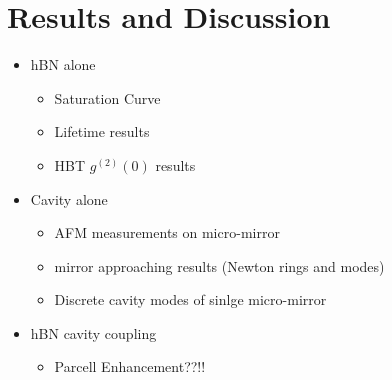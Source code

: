 \section{Results and Discussion}

\begin{itemize}
    \item hBN alone
    \begin{itemize}
        \item Saturation Curve
        \item Lifetime results
        \item HBT $g^{(2)}(0)$ results
    \end{itemize}
    \item Cavity alone
    \begin{itemize}
        \item AFM measurements on micro-mirror
        \item mirror approaching results (Newton rings and modes)
        \item Discrete cavity modes of sinlge micro-mirror
    \end{itemize}
    \item hBN cavity coupling
    \begin{itemize}
        \item Parcell Enhancement??!!
    \end{itemize}
\end{itemize}